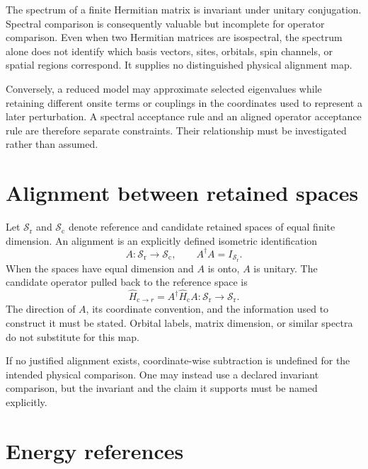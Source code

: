 The spectrum of a finite Hermitian matrix is invariant under unitary
conjugation. Spectral comparison is consequently valuable but incomplete for
operator comparison. Even when two Hermitian matrices are isospectral, the
spectrum alone does not identify which basis vectors, sites, orbitals, spin
channels, or spatial regions correspond. It supplies no distinguished physical
alignment map.

Conversely, a reduced model may approximate selected eigenvalues while
retaining different onsite terms or couplings in the coordinates used to
represent a later perturbation. A spectral acceptance rule and an aligned
operator acceptance rule are therefore separate constraints. Their relationship
must be investigated rather than assumed.

\section{Alignment between retained spaces}

Let $\mathcal S_{\mathrm r}$ and $\mathcal S_{\mathrm c}$ denote reference and
candidate retained spaces of equal finite dimension. An alignment is an
explicitly defined isometric identification
\begin{equation}
  A:\mathcal S_{\mathrm r}\longrightarrow\mathcal S_{\mathrm c},
  \qquad
  A^{\dagger}A=I_{\mathcal S_{\mathrm r}}.
\end{equation}
When the spaces have equal dimension and $A$ is onto, $A$ is unitary. The
candidate operator pulled back to the reference space is
\begin{equation}
  \widehat H_{\mathrm c\rightarrow r}
  =
  A^{\dagger}\widehat H_{\mathrm c}A
  :\mathcal S_{\mathrm r}\longrightarrow\mathcal S_{\mathrm r}.
\end{equation}
The direction of $A$, its coordinate convention, and the information used to
construct it must be stated. Orbital labels, matrix dimension, or similar
spectra do not substitute for this map.

If no justified alignment exists, coordinate-wise subtraction is undefined for
the intended physical comparison. One may instead use a declared invariant
comparison, but the invariant and the claim it supports must be named
explicitly.

\section{Energy references}

